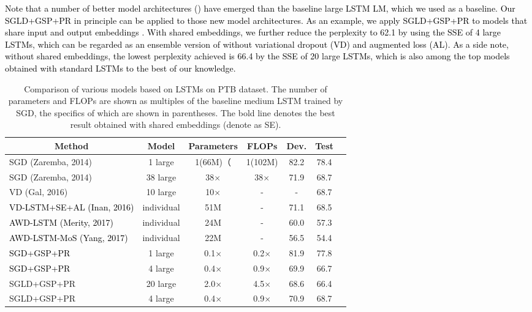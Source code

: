 \documentclass{article} %
\newcommand{\zyc}{\textcolor{black}}
\begin{document}
\zyc{
Note that a number of better model architectures (\citet{inan2016tying,merity2017regularizing,yang2017breaking}) have emerged than the baseline large LSTM LM, which we used as a baseline. Our SGLD+GSP+PR in principle can be applied to those new model architectures.
As an example, we apply SGLD+GSP+PR to models that share input and output embeddings \citet{inan2016tying}.
With shared embeddings, we further reduce the perplexity to 62.1 by using the SSE of 4 large LSTMs, which can be regarded as an ensemble version of \citet{inan2016tying} without variational dropout (VD) and augmented loss (AL). 
As a side note, without shared embeddings, the lowest perplexity achieved is 66.4 by the SSE of 20 large LSTMs, which is also among the top models obtained with standard LSTMs to the best of our knowledge.}


\begin{table}[t]
	\caption{Comparison of various models based on LSTMs on PTB dataset.
		The number of parameters and FLOPs are shown as multiples of the baseline medium LSTM trained by SGD, the specifics of which are shown in parentheses. The bold line denotes the best result obtained with shared embeddings (denote as SE). }
	\label{PTB_best}
	\begin{center}
		\begin{tabular}{lcccccc}
			\toprule
			\multicolumn{1}{c}{Method}
			&\multicolumn{1}{c}{Model}
			&\multicolumn{1}{c}{Parameters}
			&\multicolumn{1}{c}{FLOPs}
			&\multicolumn{1}{c}{Dev.} 
			&\multicolumn{1}{c}{Test}\\
			\toprule
			SGD (Zaremba, 2014)		&1 large &1(66M)（&1(102M) 	&82.2 &78.4 \\
			SGD (Zaremba, 2014)	&38 large &38$\times$ &38$\times$ 	&71.9 &68.7 \\
			VD (Gal, 2016) &10 large &10$\times$ &- 	&- &68.7 \\
			\zyc{VD-LSTM+SE+AL (Inan, 2016)} &individual  &51M &- &71.1 &68.5 \\
			\zyc{AWD-LSTM (Merity, 2017)} &individual  &24M &- 	&60.0 &57.3 \\
			\zyc{AWD-LSTM-MoS (Yang, 2017)} &individual  &22M &- 	&56.5 &54.4 \\
			\midrule
			\zyc{SGD+GSP+PR} &1 large &0.1$\times$ &0.2$\times$ &81.9 &77.8 \\
			\zyc{SGD+GSP+PR} &4 large &0.4$\times$ &0.9$\times$ &69.9 &66.7 \\
			SGLD+GSP+PR	&20 large &2.0$\times$ &4.5$\times$ 	&68.6 &66.4 \\
			SGLD+GSP+PR	&4 large &0.4$\times$ &0.9$\times$ &70.9 &68.7 \\
			

\end{tabular}
\end{center}
\end{table}
\end{document}
